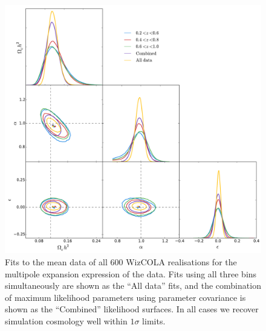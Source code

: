 \documentclass[iop,twocolappendix]{emulateapj}
\begin{document}
\begin{figure}[h!]
	\begin{center}
		\includegraphics[width=\columnwidth]{images/corCombinedMPWiz.pdf}
	\end{center}
	\caption{Fits to the mean data of all 600 WizCOLA realisations %
	for the multipole expansion expression of the data. Fits using all three bins simultaneously are shown as the ``All data'' fits, and the combination of maximum likelihood parameters using parameter covariance is shown as the ``Combined'' likelihood surfaces. In all cases we recover simulation cosmology well within $1\sigma$ limits.}
	\label{fig:corCombinedMPWiz}
\end{figure}

\end{document}
